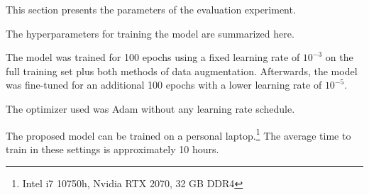 
This section presents the parameters of the evaluation
experiment.

The hyperparameters for training the model are summarized
here.


The model was trained for 100 epochs using a fixed learning
rate of $10^{-3}$ on the full training set plus both methods
of data augmentation. Afterwards, the model was fine-tuned
for an additional 100 epochs with a lower learning rate of
$10^{-5}$.


The optimizer used was Adam without any learning rate
schedule.






The proposed model can be trained on a personal
laptop.\footnote{ Intel i7 10750h, Nvidia RTX 2070, 32 GB
DDR4} The average time to train in these settings is
approximately 10 hours.

